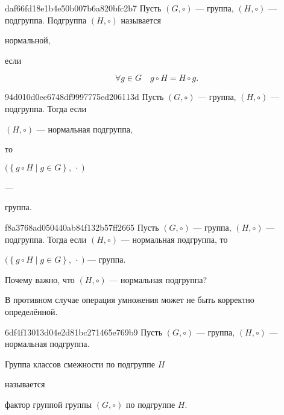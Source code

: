 \begin{note}{daf66fd18e1b4e50b007b6a820bfc2b7}
    Пусть \({ (G, \circ) }\) --- группа, \({ (H, \circ) }\) --- подгруппа.
    Подгруппа \({ (H, \circ) }\) называется \begin{icloze}{2}нормальной,\end{icloze} если
    \begin{icloze}{1}
        \[
            \forall g \in G  \quad g \circ H = H \circ g.
        \]
    \end{icloze}
\end{note}

\begin{note}{94d010d0ee6748df9997775ed206113d}
    Пусть \({ (G, \circ) }\) --- группа, \({ (H, \circ) }\) --- подгруппа.
    Тогда если \begin{icloze}{3}\({ (H, \circ) }\) --- нормальная подгруппа,\end{icloze} то
    \begin{center}
        \begin{icloze}{2}\({ \big(\left\{ g \circ H \mid g \in G \right\}, \:\cdot\:\big) }\)\end{icloze} --- \begin{icloze}{1}группа.\end{icloze}
    \end{center}
\end{note}

\begin{note}{f8a3768ad050440ab84f132b57ff2665}
    Пусть \({ (G, \circ) }\) --- группа, \({ (H, \circ) }\) --- подгруппа.
    Тогда если \({ (H, \circ) }\) --- нормальная подгруппа, то
    \begin{center}
        \({ \big(\left\{ g \circ H \mid g \in G \right\}, \:\cdot\:\big) }\) --- группа.
    \end{center}
    Почему важно, что \({ (H, \circ) }\) --- нормальная подгруппа?

    \begin{cloze}{1}
        В противном случае операция умножения может не быть корректно определённой.
    \end{cloze}
\end{note}

\begin{note}{6df4f13013d04e2d81bc271465e769b9}
    Пусть \({ (G, \circ) }\) --- группа, \({ (H, \circ) }\) --- нормальная подгруппа.
    \begin{icloze}{2}Группа классов смежности по подгруппе \({ H }\)\end{icloze} называется \begin{icloze}{1}фактор группой группы \({ (G, \circ) }\) по подгруппе \({ H }\).\end{icloze}
\end{note}


